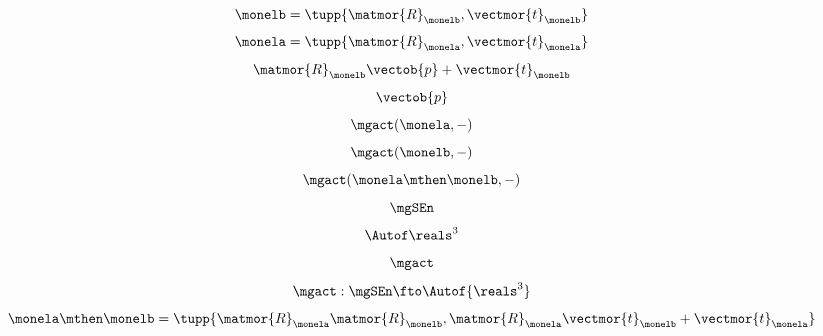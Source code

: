 \begin{forslides}
\begin{equation}\label{eq:roto-b}
  \monelb=\tupp{\matmor{R}_{\monelb}, \vectmor{t}_{\monelb}}
\end{equation}
\begin{equation}\label{eq:roto-a}
  \monela=\tupp{\matmor{R}_{\monela}, \vectmor{t}_{\monela}}
\end{equation}
\begin{equation}\label{eq:intermediate}
  \matmor{R}_{\monelb}\vectob{p} + \vectmor{t}_{\monelb}
\end{equation}
\begin{equation}\label{eq:point}
  \vectob{p} 
\end{equation}
\begin{equation}\label{eq:apply-mora}
  \mgact(\monela, -) 
  \end{equation}
  \begin{equation}\label{eq:apply-morb}
    \mgact(\monelb, -) 
    \end{equation}
  \begin{equation}\label{eq:apply-both}
    \mgact(\monela\mthen\monelb, -) 
    \end{equation}
    \begin{equation}\label{eq:only-SEn}
      \mgSEn
      \end{equation}
      \begin{equation}\label{eq:only-AutR3}
        \Autof \reals^3
        \end{equation}
        \begin{equation}\label{eq:only-apply}
         \mgact
          \end{equation}
          \begin{equation}\label{eq:apply-morphism}
            \mgact: \mgSEn \fto \Autof {\reals^3}
            \end{equation}
\begin{equation}\label{eq:rototranslation-clean}
  \monela \mthen \monelb = \tupp{\matmor{R}_{\monela} \matmor{R}_{\monelb}, \matmor{R}_{\monela} \vectmor{t}_{\monelb} + \vectmor{t}_{\monela}}
\end{equation}
\end{forslides}

